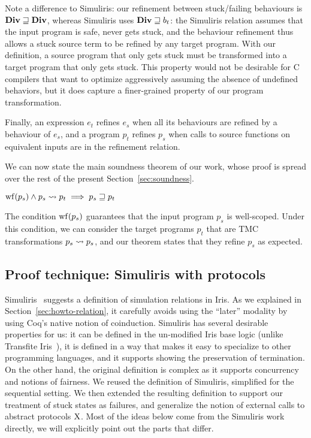 Note a difference to Simuliris: our refinement between stuck/failing behaviours is $\constr{Div} \refined \constr{Div}$, whereas Simuliris uses $\constr{Div} \refined b_t$: the Simuliris relation assumes that the input program is safe, never gets stuck, and the behaviour refinement thus allows a stuck source term to be refined by any target program. With our definition, a source program that only gets stuck must be transformed into a target program that only gets stuck.
%
This property would not be desirable for C compilers that want to optimize aggressively assuming the absence of undefined behaviors, but it does capture a finer-grained property of our program transformation.

Finally, an expression $e_t$ refines $e_s$ when all its behaviours are refined by a behaviour of $e_s$, and a program $p_t$ refines $p_s$ when calls to source functions on equivalent inputs are in the refinement relation.




We can now state the main soundness theorem of our work, whose proof is spread over the rest of the present Section~\ref{sec:soundness}.

\begin{theorem}[Soundness]
    $
        \wf{p_s} \wedge p_s \tmc p_t \implies
        p_s \refined p_t
    $
\end{theorem}

The condition $\wf{p_s}$ guarantees that the input program $p_s$ is well-scoped. Under this condition, we can consider the target programs $p_t$ that are TMC transformations $p_s \rightsquigarrow p_s$, and our theorem states that they refine $p_s$ as expected.

\subsection{Proof technique: Simuliris with protocols}

Simuliris~\citep*{TODO-simuliris} suggests a definition of simulation relations in Iris. As we explained in Section~\ref{sec:howto-relation}, it carefully avoids using the ``later'' modality by using Coq's native notion of coinduction. Simuliris has several desirable properties for us: it can be defined in the un-modified Iris base logic (unlike Transfite Iris~\citep*{transfinite-iris}), it is defined in a way that makes it easy to specialize to other programming languages, and it supports showing the preservation of termination. On the other hand, the original definition is complex as it supports concurrency and notions of fairness. We reused the definition of Simuliris, simplified for the sequential setting. We then extended the resulting definition to support our treatment of stuck states as failures, and generalize the notion of external calls to abstract protocols $\mathrm{X}$. Most of the ideas below come from the Simuliris work directly, we will explicitly point out the parts that differ.

